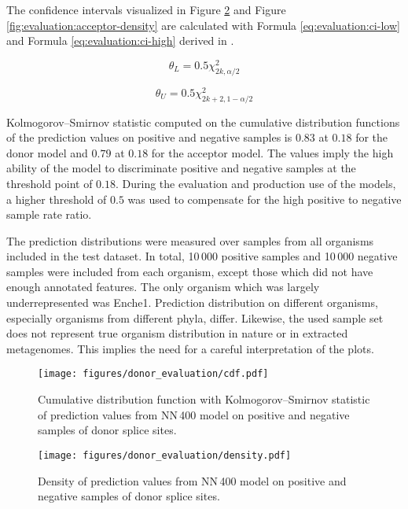 The confidence intervals visualized in Figure
\ref{fig:evaluation:donor-density} and Figure
\ref{fig:evaluation:acceptor-density} are calculated with Formula
\ref{eq:evaluation:ci-low} and Formula \ref{eq:evaluation:ci-high} derived in
\cite[p.~176]{johnson2005univariate}.

\begin{equation}
  \theta_L = 0.5 \chi^2_{2k, \alpha / 2}
  \label{eq:evaluation:ci-low}
\end{equation}

\begin{equation}
  \theta_U = 0.5 \chi^2_{2k + 2, 1 - \alpha / 2}
  \label{eq:evaluation:ci-high}
\end{equation}

Kolmogorov–Smirnov statistic computed on the cumulative distribution functions
of the prediction values on positive and negative samples is $0.83$ at $0.18$
for the donor model and $0.79$ at $0.18$ for the acceptor model. The values
imply the high ability of the model to discriminate positive and negative
samples at the threshold point of $0.18$. During the evaluation and production
use of the models, a higher threshold of $0.5$ was used to compensate for the
high positive to negative sample rate ratio.

The prediction distributions were measured over samples from all organisms
included in the test dataset. In total, 10\,000 positive samples and 10\,000
negative samples were included from each organism, except those which did not
have enough annotated features. The only organism which was largely
underrepresented was Enche1. Prediction distribution on different organisms,
especially organisms from different phyla, differ. Likewise, the used sample
set does not represent true organism distribution in nature or in extracted
metagenomes. This implies the need for a careful interpretation of the plots.

\begin{figure}
  \centering
  \texttt{[image: figures/donor\_evaluation/cdf.pdf]}
  \caption{Cumulative distribution function with Kolmogorov–Smirnov statistic
    of prediction values from NN\,400 model on positive and negative samples of
    donor splice sites. }
  \label{fig:evaluation:donor-cdf}
\end{figure}

\begin{figure}
  \centering
  \texttt{[image: figures/donor\_evaluation/density.pdf]}
  \caption{Density of prediction values from NN\,400 model on positive and
    negative samples of donor splice sites.}
  \label{fig:evaluation:donor-density}
\end{figure}

